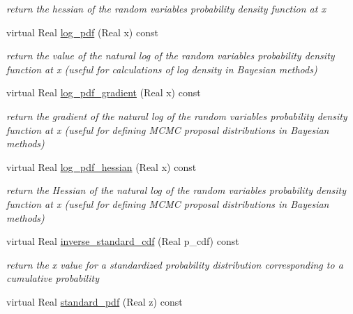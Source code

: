 \begin{DoxyCompactItemize}
\begin{DoxyCompactList}\small\item\em return the hessian of the random variable\textquotesingle{}s probability density function at x \end{DoxyCompactList}\item 
virtual Real \hyperlink{classPecos_1_1RandomVariable_a6e2b6b6f13eedb2eb1ef3bc455a06392}{log\+\_\+pdf} (Real x) const \label{classPecos_1_1RandomVariable_a6e2b6b6f13eedb2eb1ef3bc455a06392}

\begin{DoxyCompactList}\small\item\em return the value of the natural log of the random variable\textquotesingle{}s probability density function at x (useful for calculations of log density in Bayesian methods) \end{DoxyCompactList}\item 
virtual Real \hyperlink{classPecos_1_1RandomVariable_a5ccc16c04690f0c501f44c1ffae2bbd1}{log\+\_\+pdf\+\_\+gradient} (Real x) const \label{classPecos_1_1RandomVariable_a5ccc16c04690f0c501f44c1ffae2bbd1}

\begin{DoxyCompactList}\small\item\em return the gradient of the natural log of the random variable\textquotesingle{}s probability density function at x (useful for defining M\+C\+MC proposal distributions in Bayesian methods) \end{DoxyCompactList}\item 
virtual Real \hyperlink{classPecos_1_1RandomVariable_a7b43f26f0f2bcdfef15d87e1f9399b33}{log\+\_\+pdf\+\_\+hessian} (Real x) const \label{classPecos_1_1RandomVariable_a7b43f26f0f2bcdfef15d87e1f9399b33}

\begin{DoxyCompactList}\small\item\em return the Hessian of the natural log of the random variable\textquotesingle{}s probability density function at x (useful for defining M\+C\+MC proposal distributions in Bayesian methods) \end{DoxyCompactList}\item 
virtual Real \hyperlink{classPecos_1_1RandomVariable_acffcd338a207168a147fffe0778ccf3c}{inverse\+\_\+standard\+\_\+cdf} (Real p\+\_\+cdf) const \label{classPecos_1_1RandomVariable_acffcd338a207168a147fffe0778ccf3c}

\begin{DoxyCompactList}\small\item\em return the x value for a standardized probability distribution corresponding to a cumulative probability \end{DoxyCompactList}\item 
virtual Real \hyperlink{classPecos_1_1RandomVariable_a206a02581b82f44be4a5321488a12daa}{standard\+\_\+pdf} (Real z) const \label{classPecos_1_1RandomVariable_a206a02581b82f44be4a5321488a12daa}


\end{DoxyCompactItemize}
